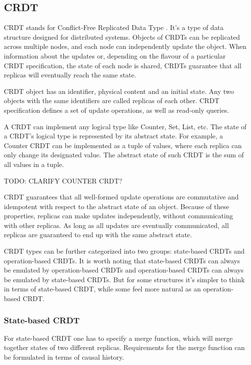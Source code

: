 \documentclass[a4paper, 11pt, oneside]{article}
\theoremstyle{definition}
\begin{document}
\subsection{CRDT}
CRDT stands for Conflict-Free Replicated Data Type \cite{crdt}. It's a type of data structure designed for distributed systems. Objects of CRDTs can be replicated across multiple nodes, and each node can independently update the object. When information about the updates or, depending on the flavour of a particular CRDT specification, the state of each node is shared, CRDTs guarantee that all replicas will eventually reach the same state.

CRDT object has an identifier, physical content and an initial state. Any two objects with the same identifiers are called replicas of each other. CRDT specification defines a set of update operations, as well as read-only queries.

A CRDT can implement any logical type like Counter, Set, List, etc. The state of a CRDT's logical type is represented by its abstract state. For example, a Counter CRDT can be implemented as a tuple of values, where each replica can only change its designated value. The abstract state of such CRDT is the sum of all values in a tuple. 

TODO: CLARIFY COUNTER CRDT?

CRDT guarantees that all well-formed update operations are commutative and idempotent with respect to the abstract state of an object. Because of these properties, replicas can make updates independently, without communicating with other replicas. As long as all updates are eventually communicated, all replicas are guaranteed to end up with the same abstract state.

CRDT types can be further categorized into two groups:  state-based CRDTs and operation-based CRDTs. It is worth noting that state-based CRDTs can always be emulated by operation-based CRDTs and operation-based CRDTs can always be emulated by state-based CRDTs. But for some structures it's simpler to think in terms of state-based CRDT, while some feel more natural as an operation-based CRDT.


\subsubsection{State-based CRDT}
For state-based CRDT one has to specify a merge function, which will merge together states of two different replicas. Requirements for the merge function can be formulated in terms of causal history.
\end{document}
